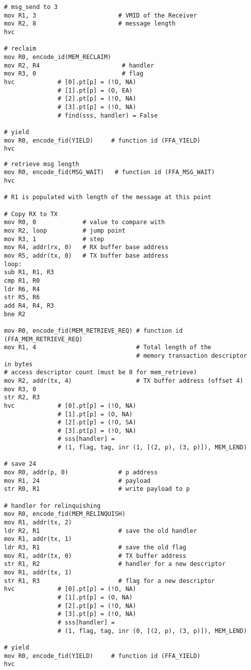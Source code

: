 \documentclass{article}
\begin{document}
\begin{lstlisting}[caption={VM 1}]
# msg_send to 3
mov R1, 3                       # VMID of the Receiver
mov R2, 8                       # message length
hvc

# reclaim
mov R0, encode_id(MEM_RECLAIM)
mov R2, R4                       # handler
mov R3, 0                        # flag
hvc            # [0].pt[p] = (!O, NA)
               # [1].pt[p] = (O, EA)
               # [2].pt[p] = (!O, NA)
               # [3].pt[p] = (!O, NA)
               # find(sss, handler) = False  
               
# yield
mov R0, encode_fid(YIELD)     # function id (FFA_YIELD)
hvc     
\end{lstlisting}

\begin{lstlisting}[caption={VM 2}]
# retrieve msg length
mov R0, encode_fid(MSG_WAIT)   # function id (FFA_MSG_WAIT)
hvc

# R1 is populated with length of the message at this point

# Copy RX to TX
mov R0, 0             # value to compare with
mov R2, loop          # jump point
mov R3, 1             # step
mov R4, addr(rx, 0)   # RX buffer base address
mov R5, addr(tx, 0)   # TX buffer base address
loop:
sub R1, R1, R3
cmp R1, R0
ldr R6, R4
str R5, R6
add R4, R4, R3
bne R2

mov R0, encode_fid(MEM_RETRIEVE_REQ) # function id (FFA_MEM_RETRIEVE_REQ)
mov R1, 4                            # Total length of the  
                                     # memory transaction descriptor in bytes
# access descriptor count (must be 0 for mem_retrieve)
mov R2, addr(tx, 4)                  # TX buffer address (offset 4)
mov R3, 0
str R2, R3                                    
hvc            # [0].pt[p] = (!O, NA)
               # [1].pt[p] = (O, NA)
               # [2].pt[p] = (!O, SA)
               # [3].pt[p] = (!O, NA)
               # sss[handler] = 
               # (1, flag, tag, inr (1, [(2, p), (3, p)]), MEM_LEND)

# save 24
mov R0, addr(p, 0)              # p address
mov R1, 24                      # payload
str R0, R1                      # write payload to p

# handler for relinquishing
mov R0, encode_fid(MEM_RELINQUISH)
mov R1, addr(tx, 2)
ldr R2, R1                      # save the old handler
mov R1, addr(tx, 1)
ldr R3, R1                      # save the old flag
mov R1, addr(tx, 0)             # TX buffer address
str R1, R2                      # handler for a new descriptor
mov R1, addr(tx, 1)
str R1, R3                      # flag for a new descriptor
hvc            # [0].pt[p] = (!O, NA)
               # [1].pt[p] = (O, NA)
               # [2].pt[p] = (!O, NA)
               # [3].pt[p] = (!O, NA)
               # sss[handler] = 
               # (1, flag, tag, inr (0, [(2, p), (3, p)]), MEM_LEND)

# yield
mov R0, encode_fid(YIELD)     # function id (FFA_YIELD)
hvc
\end{lstlisting}
\end{document}
